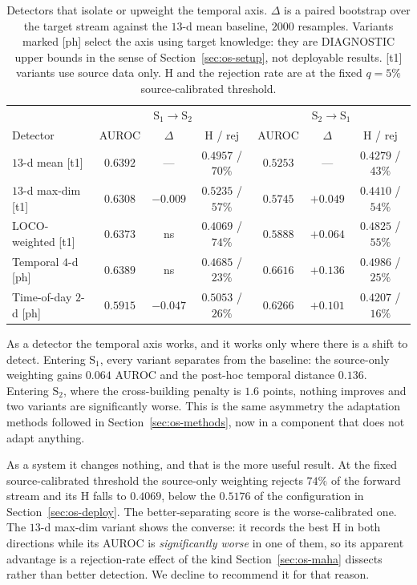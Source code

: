 \begin{table}[t]
\centering
\caption{Detectors that isolate or upweight the temporal axis. $\Delta$ is a paired
bootstrap over the target stream against the $13$-d mean baseline, $2000$ resamples.
Variants marked [ph] select the axis using target
knowledge: they are DIAGNOSTIC upper bounds in the sense of
Section~\ref{sec:os-setup}, not deployable results. [t1] variants use source data only. H and the rejection rate are at the fixed $q=5\%$
source-calibrated threshold.}
\label{tab:ostemporal}
\small
\begin{tabular}{lccc|ccc}
\toprule
 & \multicolumn{3}{c|}{$\text{S}_1\!\to\!\text{S}_2$} & \multicolumn{3}{c}{$\text{S}_2\!\to\!\text{S}_1$} \\
Detector & AUROC & $\Delta$ & H / rej & AUROC & $\Delta$ & H / rej \\
\midrule
$13$-d mean [t1]        & $0.6392$ & --- & $0.4957$ / $70\%$ & $0.5253$ & --- & $0.4279$ / $43\%$ \\
$13$-d max-dim [t1]     & $0.6308$ & $-0.009$ & $\mathbf{0.5235}$ / $57\%$ & $0.5745$ & $+0.049$ & $0.4410$ / $54\%$ \\
LOCO-weighted [t1]      & $0.6373$ & ns & $0.4069$ / $74\%$ & $0.5888$ & $+0.064$ & $\mathbf{0.4825}$ / $55\%$ \\
Temporal $4$-d [ph]     & $0.6389$ & ns & $0.4685$ / $23\%$ & $\mathbf{0.6616}$ & $+0.136$ & $0.4986$ / $25\%$ \\
Time-of-day $2$-d [ph]  & $0.5915$ & $-0.047$ & $0.5053$ / $26\%$ & $0.6266$ & $+0.101$ & $0.4207$ / $16\%$ \\
\bottomrule
\end{tabular}
\end{table}

As a detector the temporal axis works, and it works only where there is a shift to detect.
Entering $\text{S}_1$, every variant separates from the baseline: the source-only
weighting gains $0.064$ AUROC and the post-hoc temporal distance $0.136$. Entering
$\text{S}_2$, where the cross-building penalty is $1.6$ points, nothing improves and two
variants are significantly worse. This is the same asymmetry the adaptation methods
followed in Section~\ref{sec:os-methods}, now in a component that does not adapt anything.

As a system it changes nothing, and that is the more useful result. At the fixed
source-calibrated threshold the source-only weighting rejects $74\%$ of the forward stream
and its H falls to $0.4069$, below the $0.5176$ of the configuration in
Section~\ref{sec:os-deploy}. The better-separating score is the worse-calibrated one. The
$13$-d max-dim variant shows the converse: it records the best H in both directions while
its AUROC is \emph{significantly worse} in one of them, so its apparent advantage is a
rejection-rate effect of the kind Section~\ref{sec:os-maha} dissects rather than better
detection. We decline to recommend it for that reason.


